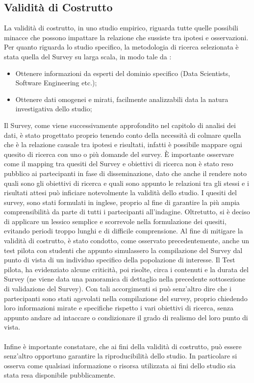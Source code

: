 \subsection{Validità di Costrutto}
La validità di costrutto, in uno studio empirico, riguarda tutte quelle possibili minacce che possono impattare la relazione che sussiste tra ipotesi e osservazioni. Per quanto riguarda lo studio specifico, la metodologia di ricerca selezionata è stata quella del Survey su larga scala, in modo tale da :

\begin{itemize}
    \item Ottenere informazioni da esperti del dominio specifico (Data Scientists, Software Engineering etc.);
    \item Ottenere dati omogenei e mirati, facilmente analizzabili data la natura investigativa dello studio;
\end{itemize}

Il Survey, come viene successivamente approfondito nel capitolo di analisi dei dati, è stato progettato proprio tenendo conto della necessità di colmare quella che è la relazione causale tra ipotesi e risultati, infatti è possibile mappare ogni quesito di ricerca con uno o più domande del survey. È importante osservare come il mapping tra quesiti del Survey e obiettivi di ricerca non è stato reso pubblico ai partecipanti in fase di disseminazione, dato che anche il rendere noto quali sono gli obiettivi di ricerca e quali sono appunto le relazioni tra gli stessi e i risultati attesi può inficiare notevolmente la validità dello studio.  I quesiti del survey, sono stati formulati in inglese, proprio al fine di garantire la più ampia comprensibilità da parte di tutti i partecipanti all'indagine. Oltretutto, si è deciso di applicare un lessico semplice e scorrevole nella formulazione dei quesiti, evitando periodi troppo lunghi e di difficile comprensione. Al fine di mitigare la validità di costrutto, è stato condotto, come osservato precedentemente, anche un test pilota con studenti che appunto simulassero la compilazione del Survey dal punto di vista di un individuo specifico della popolazione di interesse. Il Test pilota, ha evidenziato alcune criticità, poi risolte, circa i contenuti e la durata del Survey (ne viene data una panoramica di dettaglio nella precedente sottosezione di validazione del Survey). Con tali accorgimenti si può senz'altro dire che i partecipanti sono stati agevolati nella compilazione del survey, proprio chiedendo loro informazioni mirate e specifiche rispetto i vari obiettivi di ricerca, senza appunto andare ad intaccare o condizionare il grado di realismo del loro punto di vista. \\ \\
Infine è importante constatare, che ai fini della validità di costrutto, può essere senz'altro opportuno garantire la riproducibilità dello studio. In particolare si osserva come qualsiasi informazione o risorsa utilizzata ai fini dello studio sia stata resa disponibile pubblicamente.
